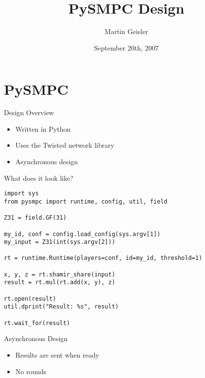 \documentclass[t,noamsthm]{beamer}
\title{PySMPC Design}
\author{Martin Geisler}
\institute[BRICS]{
  BRICS\\
  Department of Computer Science\\
  University of Aarhus
}
\date{September 20th, 2007}
\begin{document}
\begin{frame}
  \titlepage
\end{frame}



\section{PySMPC}

\begin{frame}{Design Overview}

  \begin{itemize}
  \item Written in Python
  \item Uses the Twisted network library
  \item Asynchronous design
  \end{itemize}

\end{frame}


\begin{frame}[fragile]{What does it look like?}

\begin{lstlisting}
import sys
from pysmpc import runtime, config, util, field

Z31 = field.GF(31)

my_id, conf = config.load_config(sys.argv[1])
my_input = Z31(int(sys.argv[2]))

rt = runtime.Runtime(players=conf, id=my_id, threshold=1)

x, y, z = rt.shamir_share(input)
result = rt.mul(rt.add(x, y), z)

rt.open(result)
util.dprint("Result: %s", result)

rt.wait_for(result)
\end{lstlisting}

\end{frame}


\begin{frame}{Asynchronous Design}

  \begin{itemize}
  \item Results are sent when ready
  \item No rounds
  \end{itemize}

\end{frame}
\end{document}
